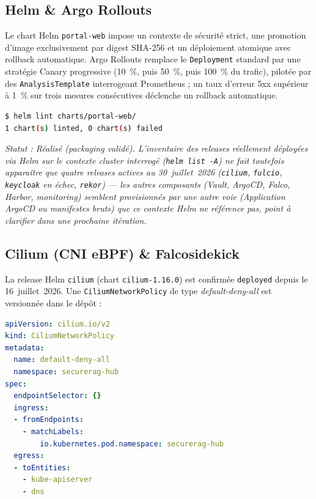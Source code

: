 \subsection{Helm \& Argo Rollouts}
Le chart Helm \texttt{portal-web} impose un contexte de sécurité strict, une promotion d'image exclusivement par digest SHA-256 et un déploiement atomique avec rollback automatique. Argo Rollouts remplace le \texttt{Deployment} standard par une stratégie Canary progressive (10~\%, puis 50~\%, puis 100~\% du trafic), pilotée par des \texttt{AnalysisTemplate} interrogeant Prometheus ; un taux d'erreur 5xx supérieur à 1~\% sur trois mesures consécutives déclenche un rollback automatique.

\begin{lstlisting}[language=bash, caption={Validation locale du chart Helm (dry-run)}, label={lst:helm_dryrun_proof}]
$ helm lint charts/portal-web/
1 chart(s) linted, 0 chart(s) failed
\end{lstlisting}

\textit{Statut : Réalisé (packaging validé). L'inventaire des releases réellement déployées via Helm sur le contexte cluster interrogé (\texttt{helm list -A}) ne fait toutefois apparaître que quatre releases actives au 30~juillet~2026 (\texttt{cilium}, \texttt{fulcio}, \texttt{keycloak} en échec, \texttt{rekor}) — les autres composants (Vault, ArgoCD, Falco, Harbor, monitoring) semblent provisionnés par une autre voie (Application ArgoCD ou manifestes bruts) que ce contexte Helm ne référence pas, point à clarifier dans une prochaine itération.}

\subsection{Cilium (CNI eBPF) \& Falcosidekick}
\label{subsec:cilium_v2}
La release Helm \texttt{cilium} (chart \texttt{cilium-1.16.0}) est confirmée \texttt{deployed} depuis le 16~juillet~2026. Une \texttt{CiliumNetworkPolicy} de type \textit{default-deny-all} est versionnée dans le dépôt :

\begin{lstlisting}[language=yaml, caption={Extrait réel de la politique réseau Zero-Trust Cilium (\texttt{infra/k8s/policies/cilium/default-deny-networkpolicy.yaml})}, label={lst:cilium_default_deny_reel}]
apiVersion: cilium.io/v2
kind: CiliumNetworkPolicy
metadata:
  name: default-deny-all
  namespace: securerag-hub
spec:
  endpointSelector: {}
  ingress:
  - fromEndpoints:
    - matchLabels:
        io.kubernetes.pod.namespace: securerag-hub
  egress:
  - toEntities:
    - kube-apiserver
    - dns
\end{lstlisting}

